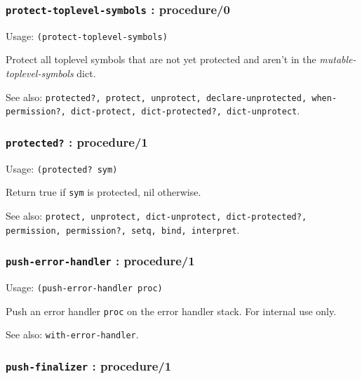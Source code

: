 \documentclass[
]{article}
\newcommand{\passthrough}[1]{#1}
\begin{document}
\hypertarget{protect-toplevel-symbols-procedure0}{%
\subsubsection{\texorpdfstring{\texttt{protect-toplevel-symbols} :
procedure/0}{protect-toplevel-symbols : procedure/0}}\label{protect-toplevel-symbols-procedure0}}

Usage: \passthrough{\lstinline!(protect-toplevel-symbols)!}

Protect all toplevel symbols that are not yet protected and aren't in
the \emph{mutable-toplevel-symbols} dict.

See also:
\passthrough{\lstinline!protected?, protect, unprotect, declare-unprotected, when-permission?, dict-protect, dict-protected?, dict-unprotect!}.

\hypertarget{protected-procedure1}{%
\subsubsection{\texorpdfstring{\texttt{protected?} :
procedure/1}{protected? : procedure/1}}\label{protected-procedure1}}

Usage: \passthrough{\lstinline!(protected? sym)!}

Return true if \passthrough{\lstinline!sym!} is protected, nil
otherwise.

See also:
\passthrough{\lstinline!protect, unprotect, dict-unprotect, dict-protected?, permission, permission?, setq, bind, interpret!}.

\hypertarget{push-error-handler-procedure1}{%
\subsubsection{\texorpdfstring{\texttt{push-error-handler} :
procedure/1}{push-error-handler : procedure/1}}\label{push-error-handler-procedure1}}

Usage: \passthrough{\lstinline!(push-error-handler proc)!}

Push an error handler \passthrough{\lstinline!proc!} on the error
handler stack. For internal use only.

See also: \passthrough{\lstinline!with-error-handler!}.

\hypertarget{push-finalizer-procedure1}{%
\subsubsection{\texorpdfstring{\texttt{push-finalizer} :
procedure/1}{push-finalizer : procedure/1}}\label{push-finalizer-procedure1}}
\end{document}
